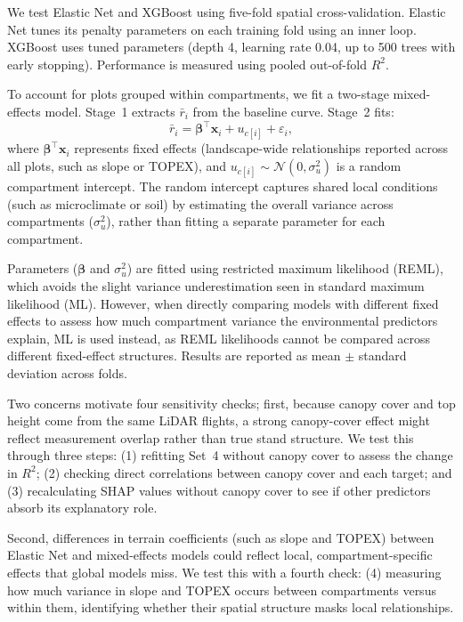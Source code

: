 We test Elastic Net and XGBoost using five-fold spatial cross-validation. Elastic Net tunes its penalty parameters on each training fold using an inner loop. XGBoost uses tuned parameters (depth 4, learning rate 0.04, up to 500 trees with early stopping). Performance is measured using pooled out-of-fold $R^2$.

To account for plots grouped within compartments, we fit a two-stage mixed-effects model. Stage~1 extracts $\bar{r}_i$ from the baseline curve. Stage~2 fits:
\begin{equation}
\bar{r}_i = \boldsymbol{\beta}^{\top}\mathbf{x}_i + u_{c[i]} + \varepsilon_i,
\label{eq:mixed-effects}
\end{equation}
where $\boldsymbol{\beta}^{\top}\mathbf{x}_i$ represents fixed effects (landscape-wide relationships reported across all plots, such as slope or TOPEX), and $u_{c[i]} \sim \mathcal{N}(0, \sigma_u^2)$ is a random compartment intercept. The random intercept captures shared local conditions (such as microclimate or soil) by estimating the overall variance across compartments ($\sigma_u^2$), rather than fitting a separate parameter for each compartment.

Parameters ($\boldsymbol{\beta}$ and $\sigma_u^2$) are fitted using restricted maximum likelihood (REML), which avoids the slight variance underestimation seen in standard maximum likelihood (ML). However, when directly comparing models with different fixed effects to assess how much compartment variance the environmental predictors explain, ML is used instead, as REML likelihoods cannot be compared across different fixed-effect structures. Results are reported as mean $\pm$ standard deviation across folds.

Two concerns motivate four sensitivity checks; first, because canopy cover and top height come from the same LiDAR flights, a strong canopy-cover effect might reflect measurement overlap rather than true stand structure. We test this through three steps: (1) refitting Set~4 without canopy cover to assess the change in $R^2$; (2) checking direct correlations between canopy cover and each target; and (3) recalculating SHAP values without canopy cover to see if other predictors absorb its explanatory role. 

Second, differences in terrain coefficients (such as slope and TOPEX) between Elastic Net and mixed-effects models could reflect local, compartment-specific effects that global models miss. We test this with a fourth check: (4) measuring how much variance in slope and TOPEX occurs between compartments versus within them, identifying whether their spatial structure masks local relationships.

